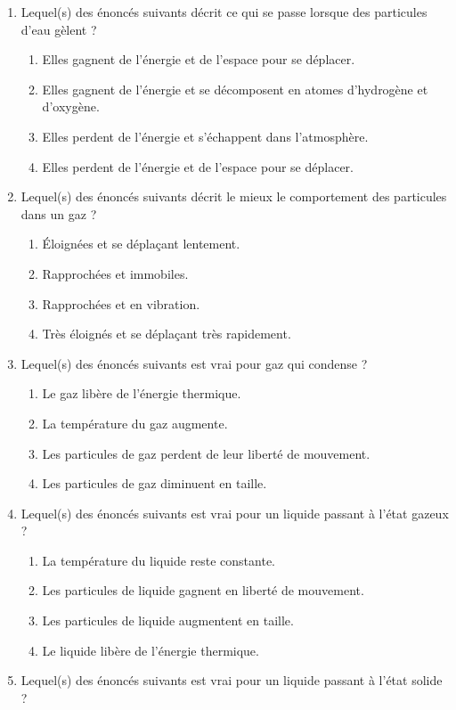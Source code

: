 \documentclass[
  11pt,
  french,
  a4paper,
  openany]{book}
\providecommand{\tightlist}{%
  \setlength{\itemsep}{0pt}\setlength{\parskip}{0pt}}
\begin{document}
\begin{Exercise}

\begin{enumerate}
\def\labelenumi{\arabic{enumi}.}
\tightlist
\item
  Lequel(s) des énoncés suivants décrit ce qui se passe lorsque des particules d'eau gèlent ?

  \begin{enumerate}
  \def\labelenumii{\alph{enumii}.}
  \tightlist
  \item
    Elles gagnent de l'énergie et de l'espace pour se déplacer.
  \item
    Elles gagnent de l'énergie et se décomposent en atomes d'hydrogène et d'oxygène.
  \item
    Elles perdent de l'énergie et s'échappent dans l'atmosphère.
  \item
    Elles perdent de l'énergie et de l'espace pour se déplacer.
  \end{enumerate}
\item
  Lequel(s) des énoncés suivants décrit le mieux le comportement des particules dans un gaz ?

  \begin{enumerate}
  \def\labelenumii{\alph{enumii}.}
  \tightlist
  \item
    Éloignées et se déplaçant lentement.
  \item
    Rapprochées et immobiles.
  \item
    Rapprochées et en vibration.
  \item
    Très éloignés et se déplaçant très rapidement.
  \end{enumerate}
\item
  Lequel(s) des énoncés suivants est vrai pour gaz qui condense ?

  \begin{enumerate}
  \def\labelenumii{\alph{enumii}.}
  \tightlist
  \item
    Le gaz libère de l'énergie thermique.
  \item
    La température du gaz augmente.
  \item
    Les particules de gaz perdent de leur liberté de mouvement.
  \item
    Les particules de gaz diminuent en taille.
  \end{enumerate}
\item
  Lequel(s) des énoncés suivants est vrai pour un liquide passant à l'état gazeux ?

  \begin{enumerate}
  \def\labelenumii{\alph{enumii}.}
  \tightlist
  \item
    La température du liquide reste constante.
  \item
    Les particules de liquide gagnent en liberté de mouvement.
  \item
    Les particules de liquide augmentent en taille.
  \item
    Le liquide libère de l'énergie thermique.
  \end{enumerate}
\item
  Lequel(s) des énoncés suivants est vrai pour un liquide passant à l'état solide ?


\end{enumerate}
\end{Exercise}
\end{document}
